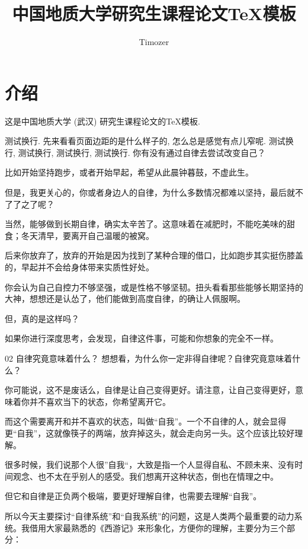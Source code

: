 \documentclass{cugrep}
\title{中国地质大学研究生课程论文\TeX{}模板}
\author{Timozer}
\begin{document}
\maketitle
{}
\tableofcontents
\thispagestyle{plain}
\clearpage
{}

\chapter{介绍}
这是中国地质大学 (武汉) 研究生课程论文的\TeX{}模板.

测试换行. 先来看看页面边距的是什么样子的, 怎么总是感觉有点儿窄呢. 测试换行, 测试换行, 测试换行, 测试换行.
你有没有通过自律去尝试改变自己？

比如开始坚持跑步，或者开始早起，希望从此晨钟暮鼓，不虚此生。

但是，我更关心的，你或者身边人的自律，为什么多数情况都难以坚持，最后就不了了之了呢？



当然，能够做到长期自律，确实太辛苦了。这意味着在减肥时，不能吃美味的甜食；冬天清早，要离开自己温暖的被窝。

后来你放弃了，放弃的开始是因为找到了某种合理的借口，比如跑步其实挺伤膝盖的，早起并不会给身体带来实质性好处。

你会认为自己自控力不够坚强，或是性格不够坚韧。扭头看看那些能够长期坚持的大神，想想还是认怂了，他们能做到高度自律，的确让人佩服啊。



但，真的是这样吗？

如果你进行深度思考，会发现，自律这件事，可能和你想象的完全不一样。



02 自律究竟意味着什么？
想想看，为什么你一定非得自律呢？自律究竟意味着什么？

你可能说，这不是废话么，自律是让自己变得更好。请注意，让自己变得更好，意味着你并不喜欢当下的状态，你希望离开它。

而这个需要离开和并不喜欢的状态，叫做“自我”。一个不自律的人，就会显得更“自我”，这就像筷子的两端，放弃掉这头，就会走向另一头。这个应该比较好理解。



很多时候，我们说那个人很”自我“，大致是指一个人显得自私、不顾未来、没有时间观念、也不太在乎别人的感受。我们想离开这种状态，倒也在情理之中。

但它和自律是正负两个极端，要更好理解自律，也需要去理解“自我”。

所以今天主要探讨“自律系统”和“自我系统”的问题，这是人类两个最重要的动力系统。我借用大家最熟悉的《西游记》来形象化，方便你的理解，主要分为三个部分：
\end{document}
